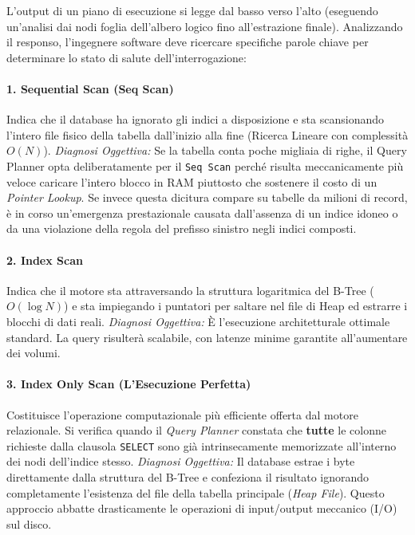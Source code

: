 L'output di un piano di esecuzione si legge dal basso verso l'alto (eseguendo un'analisi dai nodi foglia dell'albero logico fino all'estrazione finale). Analizzando il responso, l'ingegnere software deve ricercare specifiche parole chiave per determinare lo stato di salute dell'interrogazione:

\paragraph{1. Sequential Scan (Seq Scan)}
Indica che il database ha ignorato gli indici a disposizione e sta scansionando l'intero file fisico della tabella dall'inizio alla fine (Ricerca Lineare con complessità $O(N)$). 
\textit{Diagnosi Oggettiva:} Se la tabella conta poche migliaia di righe, il Query Planner opta deliberatamente per il \texttt{Seq Scan} perché risulta meccanicamente più veloce caricare l'intero blocco in RAM piuttosto che sostenere il costo di un \textit{Pointer Lookup}. Se invece questa dicitura compare su tabelle da milioni di record, è in corso un'emergenza prestazionale causata dall'assenza di un indice idoneo o da una violazione della regola del prefisso sinistro negli indici composti.

\paragraph{2. Index Scan}
Indica che il motore sta attraversando la struttura logaritmica del B-Tree ($O(\log N)$) e sta impiegando i puntatori per saltare nel file di Heap ed estrarre i blocchi di dati reali. 
\textit{Diagnosi Oggettiva:} È l'esecuzione architetturale ottimale standard. La query risulterà scalabile, con latenze minime garantite all'aumentare dei volumi.

\paragraph{3. Index Only Scan (L'Esecuzione Perfetta)}
Costituisce l'operazione computazionale più efficiente offerta dal motore relazionale. Si verifica quando il \textit{Query Planner} constata che \textbf{tutte} le colonne richieste dalla clausola \texttt{SELECT} sono già intrinsecamente memorizzate all'interno dei nodi dell'indice stesso. 
\textit{Diagnosi Oggettiva:} Il database estrae i byte direttamente dalla struttura del B-Tree e confeziona il risultato ignorando completamente l'esistenza del file della tabella principale (\textit{Heap File}). Questo approccio abbatte drasticamente le operazioni di input/output meccanico (I/O) sul disco.

